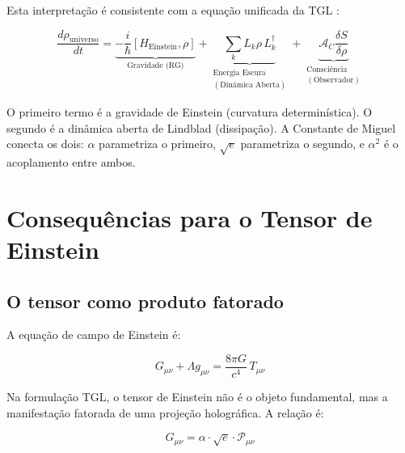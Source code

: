 \documentclass[12pt,a4paper,twoside]{article}
\newcommand{\alphaii}{\alpha^{2}}
\begin{document}
Esta interpretação é consistente com a equação unificada da TGL \cite{Miguel2026Fronteira}:

\begin{equation}
\frac{d\rho_{\text{universo}}}{dt} = \underbrace{-\frac{i}{\hbar}[H_{\text{Einstein}}, \rho]}_{\text{Gravidade (RG)}} + \underbrace{\sum_k L_k\rho\, L_k^\dagger}_{\substack{\text{Energia Escura}\\(\text{Dinâmica Aberta})}} + \underbrace{\mathcal{A}_C\frac{\delta S}{\delta\rho}}_{\substack{\text{Consciência}\\(\text{Observador})}}
\end{equation}

O primeiro termo é a gravidade de Einstein (curvatura determinística). O segundo é a dinâmica aberta de Lindblad (dissipação). A Constante de Miguel conecta os dois: $\alpha$ parametriza o primeiro, $\sqrt{e}$ parametriza o segundo, e $\alphaii$ é o acoplamento entre ambos.



\section{Consequências para o Tensor de Einstein}
\label{sec:tensor}

\subsection{O tensor como produto fatorado}

A equação de campo de Einstein é:

\begin{equation}
G_{\mu\nu} + \Lambda g_{\mu\nu} = \frac{8\pi G}{c^4}\, T_{\mu\nu}
\label{eq:einstein}
\end{equation}

Na formulação TGL, o tensor de Einstein não é o objeto fundamental, mas a manifestação fatorada de uma projeção holográfica. A relação é:

\begin{equationbox}[title={Tensor Fatorado}]
\begin{equation}
\boxed{G_{\mu\nu} = \alpha \cdot \sqrt{e} \cdot \mathcal{P}_{\mu\nu}}
\label{eq:tensor_fatorado}
\end{equation}
\end{equationbox}
\end{document}
